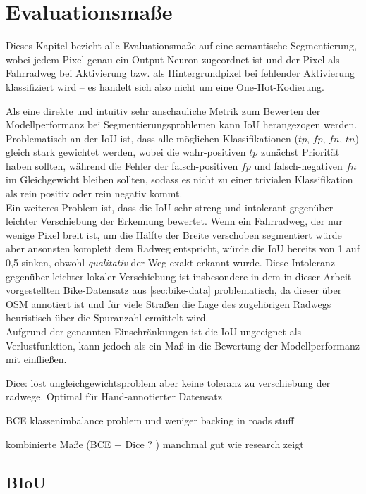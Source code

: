 \section{Evaluationsmaße} \label{sec:eval}

Dieses Kapitel bezieht alle Evaluationsmaße auf eine semantische Segmentierung, wobei jedem Pixel genau ein Output-Neuron 
zugeordnet ist und der Pixel als Fahrradweg bei Aktivierung bzw. als Hintergrundpixel bei fehlender Aktivierung klassifiziert wird --
es handelt sich also nicht um eine One-Hot-Kodierung.

Als eine direkte und intuitiv sehr anschauliche Metrik zum Bewerten der Modellperformanz bei Segmentierungsproblemen
kann \ac{IoU} herangezogen werden. \\ 
Problematisch an der \ac{IoU} ist, dass alle möglichen Klassifikationen ($tp$, $fp$, $fn$, $tn$)
gleich stark gewichtet werden, wobei die wahr-positiven $tp$ zunächst Priorität haben sollten, 
während die Fehler der falsch-positiven $fp$ und falsch-negativen $fn$ im Gleichgewicht bleiben sollten, 
sodass es nicht zu einer trivialen Klassifikation als rein positiv oder rein negativ kommt. \\
Ein weiteres Problem ist, dass die \ac{IoU} sehr streng und intolerant gegenüber leichter Verschiebung der Erkennung 
bewertet. Wenn ein Fahrradweg, der nur wenige Pixel breit ist, um die Hälfte der Breite verschoben segmentiert würde
aber ansonsten komplett dem Radweg entspricht, würde die \ac{IoU} bereits von 1 auf 0,5 sinken, obwohl \textit{qualitativ} 
der Weg exakt erkannt wurde. Diese Intoleranz gegenüber leichter lokaler Verschiebung ist insbesondere in dem 
in dieser Arbeit vorgestellten Bike-Datensatz aus \autoref{sec:bike-data} problematisch, 
da dieser über \ac{OSM} annotiert ist und für viele Straßen die Lage des zugehörigen Radwegs heuristisch über 
die Spuranzahl ermittelt wird. \\
Aufgrund der genannten Einschränkungen ist die \ac{IoU} ungeeignet als Verlustfunktion, kann jedoch als ein Maß 
in die Bewertung der Modellperformanz mit einfließen. 

Dice: löst ungleichgewichtsproblem aber keine toleranz zu verschiebung der radwege. 
Optimal für Hand-annotierter Datensatz

BCE klassenimbalance problem und weniger backing in roads stuff

kombinierte Maße (BCE + Dice ? ) manchmal gut wie research zeigt

\subsection{\acf{BIoU}} \label{sec:eval:biou}

